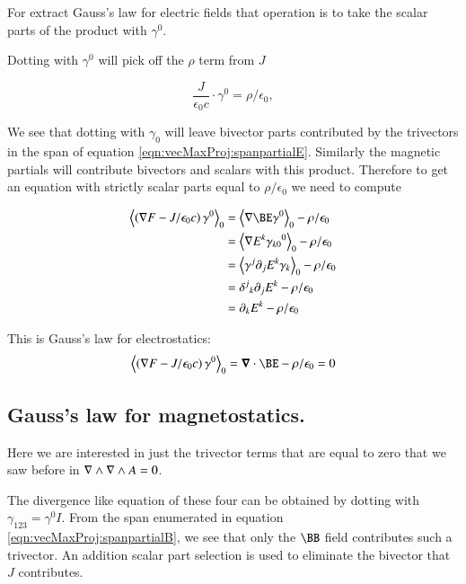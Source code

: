 For extract Gauss's law for electric fields that operation is to take the scalar
parts of the product with $\gamma^0$.

Dotting with $\gamma^0$ will pick off the $\rho$ term from
$J$

\begin{equation*}
\frac{J}{\epsilon_0 c} \cdot \gamma^0 = \rho/\epsilon_0,
\end{equation*}

We see that dotting
with $\gamma_0$ will leave bivector parts contributed by the trivectors in
the span of equation \ref{eqn:vecMaxProj:spanpartialE}.  Similarly the magnetic partials
will contribute bivectors and scalars with this product.  Therefore to
get an equation with strictly scalar parts equal to $\rho/\epsilon_0$ we need
to compute

\begin{align*}
\gpgradezero{\left(\grad F - J/\epsilon_0 c\right) \gamma^0} 
&= \gpgradezero{\grad \BE \gamma^0} - \rho/\epsilon_0 \\
&= \gpgradezero{\grad E^k {\gamma_{k0}}^0} - \rho/\epsilon_0 \\
&= \gpgradezero{ \gamma^j \partial_{j} E^k \gamma_{k} } - \rho/\epsilon_0 \\
&= {\delta^j}_k \partial_{j} E^k - \rho/\epsilon_0 \\
&= \partial_{k} E^k - \rho/\epsilon_0 \\
\end{align*}

This is Gauss's law for electrostatics:
\begin{equation}\label{eqn:vecMaxProj:gausselectro}
\gpgradezero{\left(\grad F - J/\epsilon_0 c\right) \gamma^0} = \spacegrad \cdot \BE - \rho/\epsilon_0 = 0
\end{equation}

\subsection{Gauss's law for magnetostatics. }

Here we are interested in just the trivector terms that are equal to zero that we saw before in $\nabla \wedge \nabla \wedge A = 0$.

The divergence like equation of these four can be obtained by dotting with $\gamma_{123} = \gamma^0 I$.  From the span enumerated
in equation \ref{eqn:vecMaxProj:spanpartialB}, we see that only the $\BB$ field contributes such a trivector.  An addition scalar part selection is used
to eliminate the bivector that $J$ contributes.

